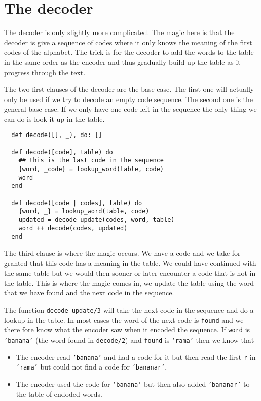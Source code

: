 \documentclass[a4paper,11pt]{article}
\begin{document}

\section{The decoder}

The decoder is only slightly more complicated. The magic here is that
the decoder is give a sequence of codes where it only knows the
meaning of the first codes of the alphabet. The trick is for the
decoder to add the words to the table in the same order as the encoder
and thus gradually build up the table as it progress through the text.

The two first clauses of the decoder are the base case. The first one
will actually only be used if we try to decode an empty code
sequence. The second one is the general base case. If we only have one
code left in the sequence the only thing we can do is look it up in the
table.

\begin{verbatim}
  def decode([], _), do: []
  
  def decode([code], table) do
    ## this is the last code in the sequence
    {word, _code} = lookup_word(table, code)
    word
  end

  def decode([code | codes], table) do
    {word, _} = lookup_word(table, code)
    updated = decode_update(codes, word, table)
    word ++ decode(codes, updated)
  end
\end{verbatim}

The third clause is where the magic occurs. We have a code and we take
for granted that this code has a meaning in the table. We could have
continued with the same table but we would then sooner or later
encounter a code that is not in the table. This is where the magic
comes in, we update the table using the word that we have found and
the next code in the sequence.

The function {\tt decode\_update/3} will take the next code in the
sequence and do a lookup in the table. In most cases the word of the
next code is {\tt found} and we there fore know what the encoder saw
when it encoded the sequence. If {\tt word} is {\tt 'banana'} (the word
found in {\tt decode/2}) and {\tt found} is {\tt 'rama'} then we know that

\begin{itemize}
\item The encoder read {\tt 'banana'} and had a code for it but then
  read the first {\tt r} in {\tt 'rama'} but could not find a code for
  {\tt 'bananar'},
  
\item The encoder used the code for {\tt 'banana'} but then also added
  {\tt 'bananar'} to the table of endoded words.
\end{itemize}
\end{document}
